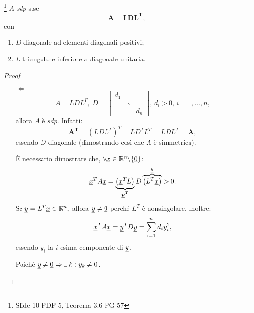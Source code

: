 \begin{theorem}\label{th:matrSDPsseLDL}\footnote{Slide 10 PDF 5, Teorema 3.6 PG 57}
    $A$ \textit{sdp} s.se \begin{equation}\label{eq:A=LDL}
        \boldsymbol{A=LDL^T},
    \end{equation} con\begin{enumerate}
        \item $D$ diagonale ad elementi diagonali positivi;
        \item $L$ triangolare inferiore a diagonale unitaria.
    \end{enumerate}
\end{theorem}
\begin{proof}
    \begin{itemize}
        \item[$\Leftarrow$]
        \begin{equation*}
            A=LDL^T,\; D=
            \begin{bmatrix}
                d_1\\
                &\ddots\\
                & & d_n
            \end{bmatrix},\, d_i>0,\, i=1,\hdots,n,
        \end{equation*}
        allora $A$ è \textit{sdp}. Infatti:
        \begin{equation*}
            \boldsymbol{A^T}=\left(LDL^T\right)^T=LD^TL^T=LDL^T=\boldsymbol A,
        \end{equation*}
        essendo $D$ diagonale (dimostrando così che $A$ è simmetrica).
        
        È necessario dimostrare che, $\forall\uline x\in\mathbb R^n\backslash\{\uline 0\}$:
        \begin{equation*}
            \uline x^T A \uline x = \underbrace{\left(\uline x^TL\right)}_{\boldsymbol{\uline y^T}}D\overbrace{\left(L^T\uline x\right)}^{\uline y}>0.
        \end{equation*}
        Se $\uline y=L^T\uline x\in\mathbb R^n,$ allora $\uline y\neq \uline 0$ perché $L^T$ è nonsingolare. Inoltre:
        \begin{equation*}
            \uline x^TA\uline x=\uline y^TD\uline y=\sum_{i=1}^n d_iy_i^2,
        \end{equation*}
        essendo $y_i$ la $i$-esima componente di $\uline y$.
        
        Poiché $\uline y\neq\uline 0\Rightarrow\exists\, k:y_k\neq 0$.
        

\end{itemize}
\end{proof}
